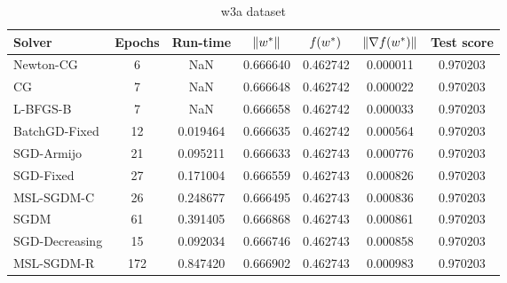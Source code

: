 \begin{table}
\centering
\caption{w3a dataset}
\label{tab:w3a-tab}
\begin{tabular}{lS[drop-zero-decimal]S[round-precision=4]S[round-precision=6]S[round-precision=6]S[exponent-mode=scientific]S[round-precision=6]}
\toprule
Solver & {Epochs} & {Run-time} & {$\lVert w^\ast\rVert$} & {$\operatorname*{\mathit{f}}(w^\ast)$} & {$\lVert\nabla f(w^\ast)\rVert$} & {Test score} \\
\midrule
Newton-CG & 6 & NaN & 0.666640 & 0.462742 & 0.000011 & 0.970203 \\
CG & 7 & NaN & 0.666648 & 0.462742 & 0.000022 & 0.970203 \\
L-BFGS-B & 7 & NaN & 0.666658 & 0.462742 & 0.000033 & 0.970203 \\
BatchGD-Fixed & 12 & 0.019464 & 0.666635 & 0.462742 & 0.000564 & 0.970203 \\
SGD-Armijo & 21 & 0.095211 & 0.666633 & 0.462743 & 0.000776 & 0.970203 \\
SGD-Fixed & 27 & 0.171004 & 0.666559 & 0.462743 & 0.000826 & 0.970203 \\
MSL-SGDM-C & 26 & 0.248677 & 0.666495 & 0.462743 & 0.000836 & 0.970203 \\
SGDM & 61 & 0.391405 & 0.666868 & 0.462743 & 0.000861 & 0.970203 \\
SGD-Decreasing & 15 & 0.092034 & 0.666746 & 0.462743 & 0.000858 & 0.970203 \\
MSL-SGDM-R & 172 & 0.847420 & 0.666902 & 0.462743 & 0.000983 & 0.970203 \\
\bottomrule
\end{tabular}
\end{table}

